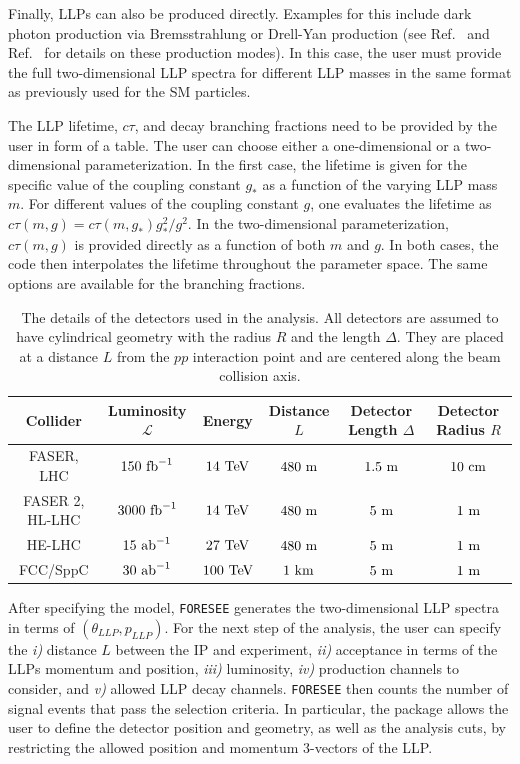 \documentclass[prd,twocolumn,reprint,preprintnumbers,nofootinbib]{revtex4-1}
\begin{document}
Finally, LLPs can also be produced directly. Examples for this include dark photon production via Bremsstrahlung or Drell-Yan production (see Ref.~\cite{Feng:2017uoz} and Ref.~\cite{Berlin:2018jbm} for details on these production modes). In this case, the user must provide the full two-dimensional LLP spectra for different LLP masses in the same format as previously used for the SM particles.

The LLP lifetime, $c\tau$, and decay branching fractions need to be provided by the user in form of a table. The user can choose either a one-dimensional or a two-dimensional parameterization. In the first case, the lifetime is given for the specific value of the coupling constant $g_*$ as a function of the varying LLP mass $m$. For different values of the coupling constant $g$, one evaluates the lifetime as $c\tau(m,g)=c\tau(m,g_*)g_*^{2}/g^2$. In the two-dimensional parameterization, $c\tau(m,g)$ is provided directly as a function of both $m$ and $g$. In both cases, the code then interpolates the lifetime throughout the parameter space. The same options are available for the branching fractions. 

\renewcommand{\arraystretch}{1.2}
\setlength{\tabcolsep}{5pt}
\begin{table}[t!]
\centering
    \begin{tabular}{c||c|c|c|c|c}
      \hline\hline
    Collider & Luminosity $\mathcal{L}$& Energy & Distance $L$ & Detector Length $\Delta$ & Detector Radius $R$\\
      \hline
      FASER, LHC  & $150~\text{fb}^{-1}$ &$14~\text{TeV}$ & $480~\text{m}$ & $1.5~\text{m}$ & $10~\text{cm}$ \\
      FASER 2, HL-LHC & $3000~\text{fb}^{-1}$ &$14~\text{TeV}$ & $480~\text{m}$ & $5~\text{m}$ & $1~\text{m}$ \\
      HE-LHC & $15~\text{ab}^{-1}$ &$27~\text{TeV}$ & $480~\text{m}$ & $5~\text{m}$ & $1~\text{m}$ \\
      FCC/SppC & $30~\text{ab}^{-1}$ &$100~\text{TeV}$ & $1~\text{km}$ & $5~\text{m}$ & $1~\text{m}$ \\
      \hline \hline
    \end{tabular}
    \caption{The details of the detectors used in the analysis. All detectors are assumed to have cylindrical geometry with the radius $R$ and the length $\Delta$. They are placed at a distance $L$ from the $pp$ interaction point and are centered along the beam collision axis.}
    \label{tab:geometries}
    \end{table}

After specifying the model, \texttt{FORESEE} generates the two-dimensional LLP spectra in terms of $(\theta_{LLP},p_{LLP})$. For the next step of the analysis, the user can specify the \textsl{i)} distance $L$ between the IP and experiment, \textsl{ii)} acceptance in terms of the LLPs momentum and position, \textsl{iii)} luminosity, \textsl{iv)} production channels to consider, and \textsl{v)} allowed LLP decay channels. \texttt{FORESEE} then counts the number of signal events that pass the selection criteria. In particular, the package allows the user to define the detector position and geometry, as well as the analysis cuts, by restricting the allowed position and momentum $3$-vectors of the LLP. 
\end{document}
